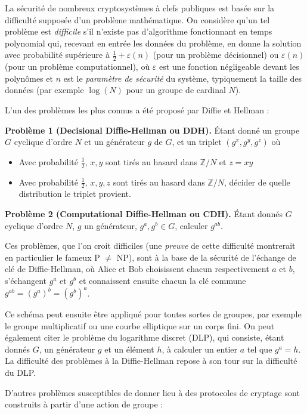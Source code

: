 \documentclass[11pt,a4paper]{article}
\newcommand{\Z}{\mathbb{Z}}
\theoremstyle{definition}
\begin{document}
La sécurité de nombreux cryptosystèmes à clefs publiques est basée sur la difficulté supposée d'un problème mathématique. On considère qu'un tel problème est \emph{difficile} s'il n'existe pas d'algorithme fonctionnant en temps polynomial qui, recevant en entrée les données du problème, en donne la solution avec probabilité supérieure à $\frac{1}{2}+\varepsilon(n)$ (pour un problème décisionnel) ou $\varepsilon(n)$ (pour un problème computationnel), où $\varepsilon$ est une fonction négligeable devant les polynômes et $n$ est le \emph{paramètre de sécurité} du système, typiquement la taille des données (par exemple $\log(N)$ pour un groupe de cardinal $N$).

L'un des problèmes les plus connus a été proposé par Diffie et Hellman :

\textbf{Problème 1 (Decisional Diffie-Hellman ou DDH).} \'Etant donné un groupe $G$ cyclique d'ordre $N$ et un générateur $g$ de $G$, et un triplet $(g^x,g^y,g^z)$ où
\begin{itemize}
\item Avec probabilité $\frac{1}{2}$, $x,y$ sont tirés au hasard dans $\Z/N$ et $z=xy$
\item Avec probabilité $\frac{1}{2}$, $x,y,z$ sont tirés au hasard dans $\Z/N$,
décider de quelle distribution le triplet provient.
\end{itemize}

\textbf{Problème 2 (Computational Diffie-Hellman ou CDH).} \'Etant donnés $G$ cyclique d'ordre $N$, $g$ un générateur, $g^a,g^b\in G$, calculer $g^{ab}$.

Ces problèmes, que l'on croit difficiles (une \emph{preuve} de cette difficulté montrerait en particulier le fameux P $\neq$ NP), sont à la base de la sécurité de l'échange de clé de Diffie-Hellman, où Alice et Bob choisissent chacun respectivement $a$ et $b$, s'échangent $g^a$ et $g^b$ et connaissent ensuite chacun la clé commune $g^{ab}=(g^a)^b=(g^b)^a$.

Ce schéma peut ensuite être appliqué pour toutes sortes de groupes, par exemple le groupe multiplicatif ou une courbe elliptique sur un corps fini. On peut également citer le problème du logarithme discret (DLP), qui consiste, étant donnés $G$, un générateur $g$ et un élément $h$, à calculer un entier $a$ tel que $g^a=h$. La difficulté des problèmes à la Diffie-Hellman repose à son tour sur la difficulté du DLP.

\vspace{5mm}

D'autres problèmes susceptibles de donner lieu à des protocoles de cryptage sont construits à partir d'une action de groupe :
\end{document}

